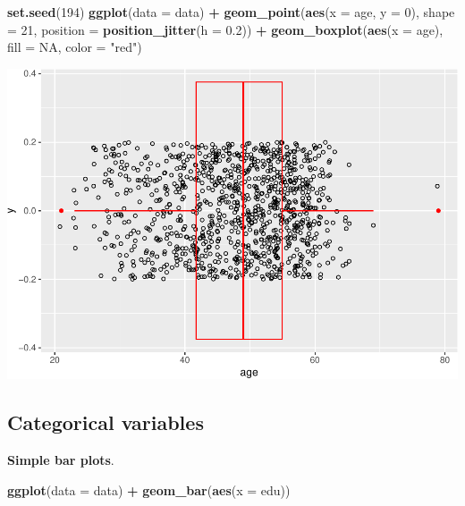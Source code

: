 \documentclass[
]{book}
\newenvironment{Shaded}{\begin{snugshade}}{\end{snugshade}}
\newcommand{\AttributeTok}[1]{\textcolor[rgb]{0.13,0.29,0.53}{#1}}
\newcommand{\ConstantTok}[1]{\textcolor[rgb]{0.56,0.35,0.01}{#1}}
\newcommand{\DecValTok}[1]{\textcolor[rgb]{0.00,0.00,0.81}{#1}}
\newcommand{\FloatTok}[1]{\textcolor[rgb]{0.00,0.00,0.81}{#1}}
\newcommand{\FunctionTok}[1]{\textcolor[rgb]{0.13,0.29,0.53}{\textbf{#1}}}
\newcommand{\NormalTok}[1]{#1}
\newcommand{\SpecialCharTok}[1]{\textcolor[rgb]{0.81,0.36,0.00}{\textbf{#1}}}
\newcommand{\StringTok}[1]{\textcolor[rgb]{0.31,0.60,0.02}{#1}}
\begin{document}
\begin{Shaded}
\begin{Highlighting}[]
\FunctionTok{set.seed}\NormalTok{(}\DecValTok{194}\NormalTok{)}
\FunctionTok{ggplot}\NormalTok{(}\AttributeTok{data =}\NormalTok{ data) }\SpecialCharTok{+}
  \FunctionTok{geom\_point}\NormalTok{(}\FunctionTok{aes}\NormalTok{(}\AttributeTok{x =}\NormalTok{ age, }\AttributeTok{y =} \DecValTok{0}\NormalTok{), }
             \AttributeTok{shape =} \DecValTok{21}\NormalTok{,}
             \AttributeTok{position =} \FunctionTok{position\_jitter}\NormalTok{(}\AttributeTok{h =} \FloatTok{0.2}\NormalTok{)) }\SpecialCharTok{+}
  \FunctionTok{geom\_boxplot}\NormalTok{(}\FunctionTok{aes}\NormalTok{(}\AttributeTok{x =}\NormalTok{ age), }\AttributeTok{fill =} \ConstantTok{NA}\NormalTok{, }\AttributeTok{color =} \StringTok{"red"}\NormalTok{)}
\end{Highlighting}
\end{Shaded}

\includegraphics{R-for-social-research-and-business-analytics_files/figure-latex/unnamed-chunk-24-1.pdf}

\hypertarget{categorical-variables}{%
\subsection{Categorical variables}\label{categorical-variables}}

\textbf{Simple bar plots}.

\begin{Shaded}
\begin{Highlighting}[]
\FunctionTok{ggplot}\NormalTok{(}\AttributeTok{data =}\NormalTok{ data) }\SpecialCharTok{+}
  \FunctionTok{geom\_bar}\NormalTok{(}\FunctionTok{aes}\NormalTok{(}\AttributeTok{x =}\NormalTok{ edu))}
\end{Highlighting}
\end{Shaded}
\end{document}
